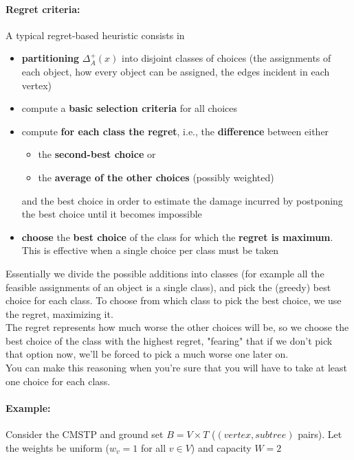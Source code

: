 \paragraph{Regret criteria:} A typical regret-based heuristic consists in
\begin{itemize}
	\item \textbf{partitioning} $\Delta_A^+ (x)$ into disjoint classes of choices (the assignments of each object, how every object can be assigned, the edges incident in each vertex)
	
	\item compute a \textbf{basic selection criteria} for all choices
	
	\item compute \textbf{for each class the regret}, i.e., the \textbf{difference} between either
	\begin{itemize}
		\item the \textbf{second-best choice} or
		\item the \textbf{average of the other choices} (possibly weighted)
	\end{itemize}
	and the best choice in order to estimate the damage incurred by postponing the best choice until it becomes impossible
	
	\item \textbf{choose} the \textbf{best choice} of the class for which the \textbf{regret is maximum}. This is effective when a single choice per class must be taken
\end{itemize}

Essentially we divide the possible additions into classes (for example all the feasible assignments of an object is a single class), and pick the (greedy) best choice for each class. To choose from which class to pick the best choice, we use the regret, maximizing it.\\

The regret represents how much worse the other choices will be, so we choose the best choice of the class with the highest regret, "fearing" that if we don't pick that option now, we'll be forced to pick a much worse one later on. \\

You can make this reasoning when you're sure that you will have to take at least one choice for each class.\\

\paragraph{Example:} Consider the CMSTP and ground set $B = V \times T$ ($(vertex,subtree)$ pairs). Let the weights be uniform ($w_v = 1$ for all $v \in V$) and capacity $W = 2$

